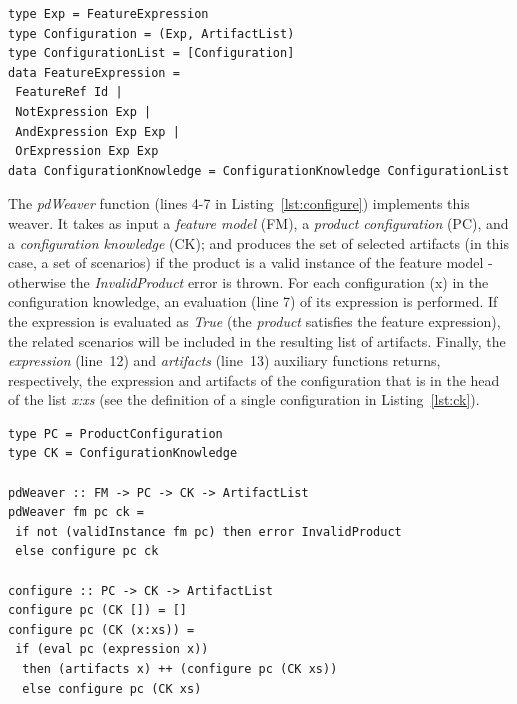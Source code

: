 \begin{lstlisting}[belowskip=20pt,frame=tb,caption={Configuration Knowledge},label=lst:ck]
type Exp = FeatureExpression
type Configuration = (Exp, ArtifactList)
type ConfigurationList = [Configuration]
data FeatureExpression =
 FeatureRef Id |
 NotExpression Exp |
 AndExpression Exp Exp |
 OrExpression Exp Exp
data ConfigurationKnowledge = ConfigurationKnowledge ConfigurationList
\end{lstlisting}

The \emph{pdWeaver} function (lines 4-7 in
Listing~\ref{lst:configure}) implements this weaver. It
takes as input a \emph{feature model} (FM), a \emph{product configuration} (PC),
and a \emph{configuration knowledge} (CK); and produces the set of
selected artifacts (in this case, a set of scenarios) if the product is a valid instance 
of the feature model - otherwise the \emph{InvalidProduct} error is thrown. For each
configuration (x) in the configuration knowledge, an evaluation (line 7) of its
expression is performed. If the expression is evaluated as
\emph{True} (the \emph{product} satisfies the feature expression), the
related scenarios will be included in the resulting list of artifacts. Finally, the 
\emph{expression} (line~12) and \emph{artifacts} (line~13) auxiliary functions returns, respectively, the expression 
and artifacts of the configuration that is in the head of the list \emph{x:xs} (see the definition of a single
configuration in Listing~\ref{lst:ck}).

\begin{lstlisting}[belowskip=20pt,frame=tb,caption={The \emph{configure weaver} function},label=lst:configure]
type PC = ProductConfiguration
type CK = ConfigurationKnowledge

pdWeaver :: FM -> PC -> CK -> ArtifactList
pdWeaver fm pc ck = 
 if not (validInstance fm pc) then error InvalidProduct
 else configure pc ck

configure :: PC -> CK -> ArtifactList
configure pc (CK []) = []
configure pc (CK (x:xs)) =
 if (eval pc (expression x))
  then (artifacts x) ++ (configure pc (CK xs))
  else configure pc (CK xs)
\end{lstlisting}

